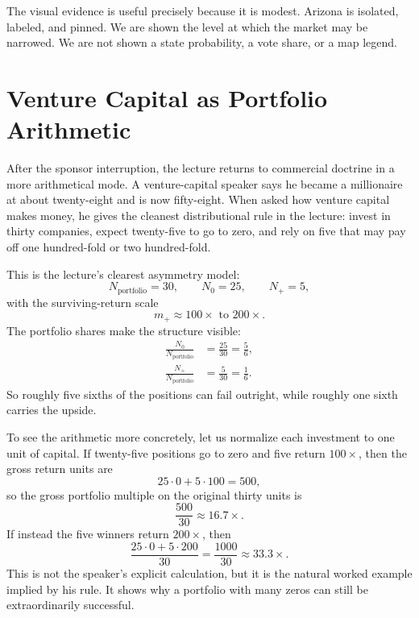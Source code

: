 The visual evidence is useful precisely because it is modest. Arizona is isolated, labeled, and pinned. We are shown the level at which the market may be narrowed. We are not shown a state probability, a vote share, or a map legend.

\section{Venture Capital as Portfolio Arithmetic}

After the sponsor interruption, the lecture returns to commercial doctrine in a more arithmetical mode. A venture-capital speaker says he became a millionaire at about twenty-eight and is now fifty-eight. When asked how venture capital makes money, he gives the cleanest distributional rule in the lecture: invest in thirty companies, expect twenty-five to go to zero, and rely on five that may pay off one hundred-fold or two hundred-fold.

This is the lecture's clearest asymmetry model:
\begin{equation}
N_{\text{portfolio}}=30,\qquad
N_{0}=25,\qquad
N_{+}=5,
\end{equation}
with the surviving-return scale
\begin{equation}
m_{+}\approx 100\times \text{ to } 200\times.
\end{equation}
The portfolio shares make the structure visible:
\begin{align}
\frac{N_0}{N_{\text{portfolio}}} &= \frac{25}{30}=\frac{5}{6},\\
\frac{N_+}{N_{\text{portfolio}}} &= \frac{5}{30}=\frac{1}{6}.
\end{align}
So roughly five sixths of the positions can fail outright, while roughly one sixth carries the upside.

To see the arithmetic more concretely, let us normalize each investment to one unit of capital. If twenty-five positions go to zero and five return \(100\times\), then the gross return units are
\begin{equation}
25\cdot 0 + 5\cdot 100 = 500,
\end{equation}
so the gross portfolio multiple on the original thirty units is
\begin{equation}
\frac{500}{30}\approx 16.7\times.
\end{equation}
If instead the five winners return \(200\times\), then
\begin{equation}
\frac{25\cdot 0 + 5\cdot 200}{30}=\frac{1000}{30}\approx 33.3\times.
\end{equation}
This is not the speaker's explicit calculation, but it is the natural worked example implied by his rule. It shows why a portfolio with many zeros can still be extraordinarily successful.

